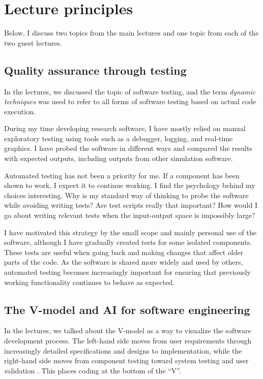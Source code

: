 \documentclass{article}
\begin{document}
\section{Lecture principles}
Below, I discuss two topics from the main lectures and one topic from each of the two guest lectures.

\subsection{Quality assurance through testing}
In the lectures, we discussed the topic of software testing, and the term \emph{dynamic techniques} was used to refer to all forms of software testing based on actual code execution. 

During my time developing research software, I have mostly relied on manual exploratory testing using tools such as a debugger, logging, and real-time graphics. I have probed the software in different ways and compared the results with expected outputs, including outputs from other simulation software.

Automated testing has not been a priority for me. If a component has been shown to work, I expect it to continue working. I find the psychology behind my choices interesting. Why is my standard way of thinking to probe the software while avoiding writing tests? Are test scripts really that important? How would I go about writing relevant tests when the input-output space is impossibly large?

I have motivated this strategy by the small scope and mainly personal use of the software, although I have gradually created tests for some isolated components. These tests are useful when going back and making changes that affect older parts of the code. As the software is shared more widely and used by others, automated testing becomes increasingly important for ensuring that previously working functionality continues to behave as expected.

\subsection{The V-model and AI for software engineering}
In the lectures, we talked about the V-model as a way to visualize the software development process. 
The left-hand side moves from user requirements through increasingly detailed specifications and designs to implementation, while the right-hand side moves from component testing toward system testing and user validation \cite{forsberg1991relationship}. 
This places coding at the bottom of the \enquote{V}.
\end{document}
